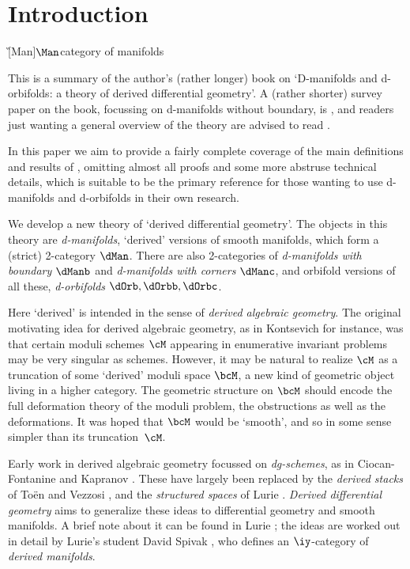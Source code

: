 \documentclass{article}
\begin{document}
\setcounter{tocdepth}{2}
\tableofcontents

\section{Introduction}
\label{ds1}
\G[Man]{$\Man$}{category of manifolds\nomnorefpage}

This is a summary of the author's (rather longer) book \cite{Joyc6}
on `D-manifolds and d-orbifolds: a theory of derived differential
geometry'. A (rather shorter) survey paper on the book, focussing on
d-manifolds without boundary, is \cite{Joyc7}, and readers just
wanting a general overview of the theory are advised to read
\cite{Joyc7}.

In this paper we aim to provide a fairly complete coverage of the
main definitions and results of \cite{Joyc6}, omitting almost all
proofs and some more abstruse technical details, which is suitable
to be the primary reference for those wanting to use d-manifolds and
d-orbifolds in their own research.

We develop a new theory of `derived differential geometry'. The
objects in this theory are {\it d-manifolds}, `derived' versions of
smooth manifolds, which form a (strict) 2-category $\dMan$. There
are also 2-categories of {\it d-manifolds with boundary\/} $\dManb$
and {\it d-manifolds with corners\/} $\dManc$, and orbifold versions
of all these, {\it d-orbifolds\/} $\dOrb,\dOrbb,\dOrbc$.

Here `derived' is intended in the sense of {\it derived algebraic
geometry}. The original motivating
idea for derived algebraic geometry, as in Kontsevich \cite{Kont}
for instance, was that certain moduli schemes $\cM$ appearing in
enumerative invariant problems may be very singular as schemes.
However, it may be natural to realize $\cM$ as a truncation of some
`derived' moduli space $\bcM$, a new kind of geometric object living
in a higher category. The geometric structure on $\bcM$ should
encode the full deformation theory of the moduli problem, the
obstructions as well as the deformations. It was hoped that $\bcM$
would be `smooth', and so in some sense simpler than its
truncation~$\cM$.

Early work in derived algebraic geometry focussed on {\it
dg-schemes}, as in Ciocan-Fontanine and Kapranov
\cite{CiKa}. These have largely been replaced by the {\it derived
stacks\/} of To\"en and Vezzosi \cite{Toen,ToVe1,ToVe2},
and the {\it structured spaces\/} of Lurie \cite{Luri1,Luri2,Luri3}.
{\it Derived differential geometry\/} aims to generalize these ideas
to differential geometry and smooth manifolds. A brief note about it
can be found in Lurie \cite[\S 4.5]{Luri3}; the ideas are worked out
in detail by Lurie's student David Spivak \cite{Spiv}, who defines
an $\iy$-category of {\it derived
manifolds}.
\end{document}
